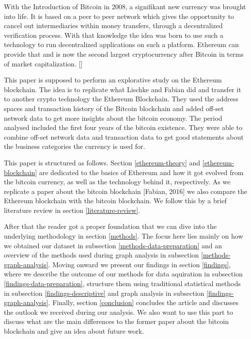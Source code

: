 With the Introduction of Bitcoin in 2008, a signifikant new currency was brought into life.
It is based on a peer to peer network which gives the opportunity to cancel out intermediaries within money transfers, through a decentralized verification process.
With that knowledge the idea was born to use such a technology to run decentralized applications on such a platform.
Ethereum can provide that and is now the second largest cryptocurrency after Bitcoin in terms of market capitalization. []

This paper is supposed to perform an explorative study on the Ethereum blockchain. 
The idea is to replicate what Lischke and Fabian did and transfer it to another crypto technology the Ethereum Blockchain. 
They used the address spaces and transaction history of the Bitcoin blockchain and added off-set network data to get more insights about the bitcoin economy. 
The period analysed included the first four years of the bitcoin existence. 
They were able to combine off-set network data and transaction data to get good statements about the business categories the currency is used for.

This paper is structured as follows. 
Section \ref{ethereum-theory} and \ref{ethereum-blockchain} are dedicated to the basics of Ethereum and how it got evolved from the bitcoin currency, as well as the technology behind it, respectively. 
As we replicate a paper about the bitcoin blockchain [Fabian, 2016] we also compare the Ethereum blockchain with the bitcoin blockchain. We follow this by a brief literature review in section \ref{literature-review}.


After that the reader got a proper foundation that we can dive into the underlying methodology in section \ref{methods}. 
The focus here lies mainly on how we obtained our dataset in subsection \ref{methods-data-preparation} and an overview of the methods used during graph analysis in subsection \ref{methods-graph-analysis}. 
Moving onward we present our findings in section \ref{findings}, where we describe the outcome of our methods for data aquiration in subsection \ref{findings-data-preparation}, structure them using traditional statistical methods in subsection \ref{findings-descriptive} and graph analysis in subsection \ref{findings-graph-analysis}.
Finally, section \ref{conclusion} concludes the article and discusses the outlook we received during our analysis. 
We also want to use this part to discuss what are the main differences to the former paper about the bitcoin blockchain and give an idea about future work. 
